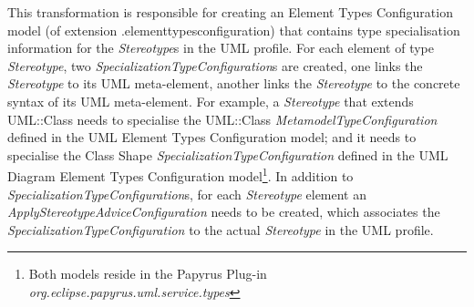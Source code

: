 This transformation is responsible for creating an Element Types Configuration model (of extension .elementtypesconfiguration) that contains type specialisation information for the \textit{Stereotype}s in the UML profile. 
For each element of type \textit{Stereotype}, two \textit{SpecializationTypeConfiguration}s are created, one links the \textit{Stereotype} to its UML meta-element, another links the \textit{Stereotype} to the concrete syntax of its UML meta-element.
For example, a \textit{Stereotype} that extends UML::Class needs to specialise the UML::Class \textit{MetamodelTypeConfiguration} defined in the UML Element Types Configuration model; and it needs to specialise the Class Shape \textit{SpecializationTypeConfiguration} defined in the UML Diagram Element Types Configuration model\footnote{Both models reside in the Papyrus Plug-in \textit{org.eclipse.papyrus.uml.service.types}}. 
In addition to \textit{SpecializationTypeConfiguration}s, for each \textit{Stereotype} element an \textit{ApplyStereotypeAdviceConfiguration} needs to be created, which associates the \textit{SpecializationTypeConfiguration} to the actual \textit{Stereotype} in the UML profile.


